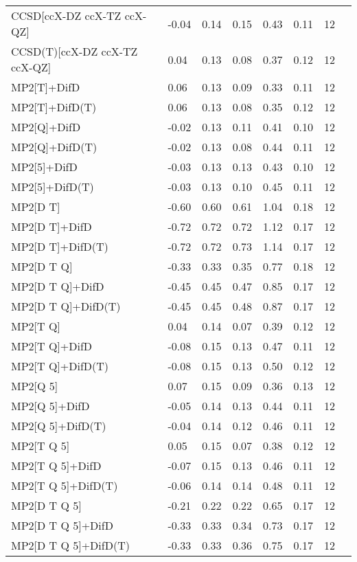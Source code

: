 \begin{table}
\begin{tabular}{l l l l l l l l }
    CCSD[ccX-DZ ccX-TZ ccX-QZ] & -0.04 & 0.14 & 0.15 & 0.43 & 0.11 & 12 \\ 
    CCSD(T)[ccX-DZ ccX-TZ ccX-QZ] & 0.04 & 0.13 & 0.08 & 0.37 & 0.12 & 12 \\ 
    MP2[T]+DifD & 0.06 & 0.13 & 0.09 & 0.33 & 0.11 & 12 \\ 
    MP2[T]+DifD(T) & 0.06 & 0.13 & 0.08 & 0.35 & 0.12 & 12 \\ 
    MP2[Q]+DifD & -0.02 & 0.13 & 0.11 & 0.41 & 0.10 & 12 \\ 
    MP2[Q]+DifD(T) & -0.02 & 0.13 & 0.08 & 0.44 & 0.11 & 12 \\ 
    MP2[5]+DifD & -0.03 & 0.13 & 0.13 & 0.43 & 0.10 & 12 \\ 
    MP2[5]+DifD(T) & -0.03 & 0.13 & 0.10 & 0.45 & 0.11 & 12 \\ 
    MP2[D T] & -0.60 & 0.60 & 0.61 & 1.04 & 0.18 & 12 \\ 
    MP2[D T]+DifD & -0.72 & 0.72 & 0.72 & 1.12 & 0.17 & 12 \\ 
    MP2[D T]+DifD(T) & -0.72 & 0.72 & 0.73 & 1.14 & 0.17 & 12 \\ 
    MP2[D T Q] & -0.33 & 0.33 & 0.35 & 0.77 & 0.18 & 12 \\ 
    MP2[D T Q]+DifD & -0.45 & 0.45 & 0.47 & 0.85 & 0.17 & 12 \\ 
    MP2[D T Q]+DifD(T) & -0.45 & 0.45 & 0.48 & 0.87 & 0.17 & 12 \\ 
    MP2[T Q] & 0.04 & 0.14 & 0.07 & 0.39 & 0.12 & 12 \\ 
    MP2[T Q]+DifD & -0.08 & 0.15 & 0.13 & 0.47 & 0.11 & 12 \\ 
    MP2[T Q]+DifD(T) & -0.08 & 0.15 & 0.13 & 0.50 & 0.12 & 12 \\ 
    MP2[Q 5] & 0.07 & 0.15 & 0.09 & 0.36 & 0.13 & 12 \\ 
    MP2[Q 5]+DifD & -0.05 & 0.14 & 0.13 & 0.44 & 0.11 & 12 \\ 
    MP2[Q 5]+DifD(T) & -0.04 & 0.14 & 0.12 & 0.46 & 0.11 & 12 \\ 
    MP2[T Q 5] & 0.05 & 0.15 & 0.07 & 0.38 & 0.12 & 12 \\ 
    MP2[T Q 5]+DifD & -0.07 & 0.15 & 0.13 & 0.46 & 0.11 & 12 \\ 
    MP2[T Q 5]+DifD(T) & -0.06 & 0.14 & 0.14 & 0.48 & 0.11 & 12 \\ 
    MP2[D T Q 5] & -0.21 & 0.22 & 0.22 & 0.65 & 0.17 & 12 \\ 
    MP2[D T Q 5]+DifD & -0.33 & 0.33 & 0.34 & 0.73 & 0.17 & 12 \\ 
    MP2[D T Q 5]+DifD(T) & -0.33 & 0.33 & 0.36 & 0.75 & 0.17 & 12 \\ 
    \bottomrule
  \end{tabular}
\end{table}
